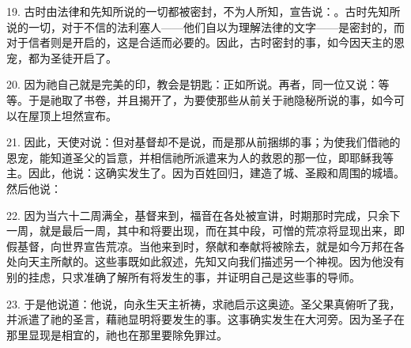 19. 古时由法律和先知所说的一切都被密封，不为人所知，宣告说：。古时先知所说的一切，对于不信的法利塞人——他们自以为理解法律的文字——是密封的，而对于信者则是开启的，这是合适而必要的。因此，古时密封的事，如今因天主的恩宠，都为圣徒开启了。\par

20. 因为祂自己就是完美的印，教会是钥匙：正如所说。再者，同一位又说：等等。于是祂取了书卷，并且揭开了，为要使那些从前关于祂隐秘所说的事，如今可以在屋顶上坦然宣布。\par

21. 因此，天使对说：但对基督却不是说，而是那从前捆绑的事；为使我们借祂的恩宠，能知道圣父的旨意，并相信祂所派遣来为人的救恩的那一位，即耶稣我等主。因此，他说：这确实发生了。因为百姓回归，建造了城、圣殿和周围的城墙。然后他说：\par

22. 因为当六十二周满全，基督来到，福音在各处被宣讲，时期那时完成，只余下一周，就是最后一周，其中和将要出现，而在其中段，可憎的荒凉将显现出来，即假基督，向世界宣告荒凉。当他来到时，祭献和奉献将被除去，就是如今万邦在各处向天主所献的。这些事既如此叙述，先知又向我们描述另一个神视。因为他没有别的挂虑，只求准确了解所有将发生的事，并证明自己是这些事的导师。\par

23. 于是他说道：他说，向永生天主祈祷，求祂启示这奥迹。圣父果真俯听了我，并派遣了祂的圣言，藉祂显明将要发生的事。这事确实发生在大河旁。因为圣子在那里显现是相宜的，祂也在那里要除免罪过。\par

